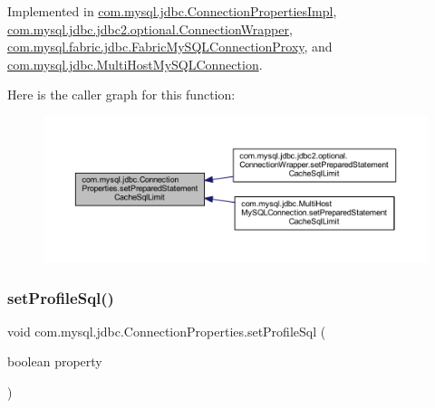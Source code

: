 Implemented in \mbox{\hyperlink{classcom_1_1mysql_1_1jdbc_1_1_connection_properties_impl_ab0d1a7e28fc1bcf16c1ee658e6a6ef7a}{com.\+mysql.\+jdbc.\+Connection\+Properties\+Impl}}, \mbox{\hyperlink{classcom_1_1mysql_1_1jdbc_1_1jdbc2_1_1optional_1_1_connection_wrapper_acdf5cc8f365225e264d7a667a13abcba}{com.\+mysql.\+jdbc.\+jdbc2.\+optional.\+Connection\+Wrapper}}, \mbox{\hyperlink{classcom_1_1mysql_1_1fabric_1_1jdbc_1_1_fabric_my_s_q_l_connection_proxy_a6ac81153a1a5ec00beb700533a56fa5f}{com.\+mysql.\+fabric.\+jdbc.\+Fabric\+My\+S\+Q\+L\+Connection\+Proxy}}, and \mbox{\hyperlink{classcom_1_1mysql_1_1jdbc_1_1_multi_host_my_s_q_l_connection_aeab0c45eb21ae847d8275f48c9bf045b}{com.\+mysql.\+jdbc.\+Multi\+Host\+My\+S\+Q\+L\+Connection}}.

Here is the caller graph for this function\+:\nopagebreak
\begin{figure}[H]
\begin{center}
\leavevmode
\includegraphics[width=350pt]{interfacecom_1_1mysql_1_1jdbc_1_1_connection_properties_a7cf7fc262516d73e70ac5dbba0d6a510_icgraph}
\end{center}
\end{figure}
\mbox{\label{interfacecom_1_1mysql_1_1jdbc_1_1_connection_properties_a6e32297fa42ce676613c35580365416a}} 
\subsubsection{\texorpdfstring{set\+Profile\+Sql()}{setProfileSql()}}
{\footnotesize\ttfamily void com.\+mysql.\+jdbc.\+Connection\+Properties.\+set\+Profile\+Sql (\begin{DoxyParamCaption}\item[{boolean}]{property }\end{DoxyParamCaption})}


